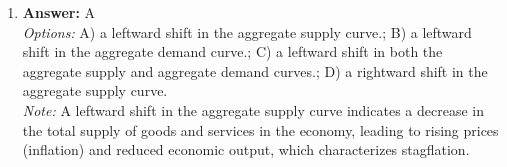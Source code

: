 \documentclass[12pt]{article}
\begin{document}
\begin{enumerate}[label=\arabic*.]
\\ \textit{Note:} Expansionary monetary policy lowers interest rates, encouraging borrowing and spending, which boosts aggregate demand, leading to higher real GDP and increased employment during a recession.
\item \textbf{Answer:} A
\\ \textit{Options:} A) a leftward shift in the aggregate supply curve.; B) a leftward shift in the aggregate demand curve.; C) a leftward shift in both the aggregate supply and aggregate demand curves.; D) a rightward shift in the aggregate supply curve.
\\ \textit{Note:} A leftward shift in the aggregate supply curve indicates a decrease in the total supply of goods and services in the economy, leading to rising prices (inflation) and reduced economic output, which characterizes stagflation.
\end{enumerate}
\end{document}
